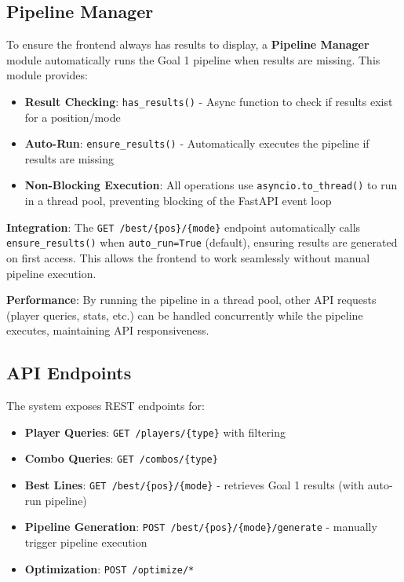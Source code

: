 \subsection{Pipeline Manager}

To ensure the frontend always has results to display, a \textbf{Pipeline Manager} module automatically runs the Goal 1 pipeline when results are missing. This module provides:

\begin{itemize}
    \item \textbf{Result Checking}: \texttt{has\_results()} - Async function to check if results exist for a position/mode
    \item \textbf{Auto-Run}: \texttt{ensure\_results()} - Automatically executes the pipeline if results are missing
    \item \textbf{Non-Blocking Execution}: All operations use \texttt{asyncio.to\_thread()} to run in a thread pool, preventing blocking of the FastAPI event loop
\end{itemize}

\textbf{Integration}: The \texttt{GET /best/\{pos\}/\{mode\}} endpoint automatically calls \texttt{ensure\_results()} when \texttt{auto\_run=True} (default), ensuring results are generated on first access. This allows the frontend to work seamlessly without manual pipeline execution.

\textbf{Performance}: By running the pipeline in a thread pool, other API requests (player queries, stats, etc.) can be handled concurrently while the pipeline executes, maintaining API responsiveness.

\subsection{API Endpoints}

The system exposes REST endpoints for:

\begin{itemize}
    \item \textbf{Player Queries}: \texttt{GET /players/\{type\}} with filtering
    \item \textbf{Combo Queries}: \texttt{GET /combos/\{type\}}
    \item \textbf{Best Lines}: \texttt{GET /best/\{pos\}/\{mode\}} - retrieves Goal 1 results (with auto-run pipeline)
    \item \textbf{Pipeline Generation}: \texttt{POST /best/\{pos\}/\{mode\}/generate} - manually trigger pipeline execution
    \item \textbf{Optimization}: \texttt{POST /optimize/*}
\end{itemize}